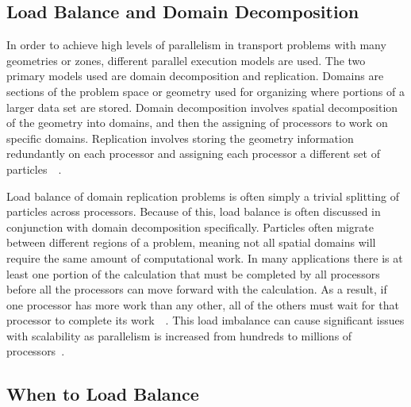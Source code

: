 \subsection{ \textbf{ Load Balance and Domain Decomposition} }

In order to achieve high levels of parallelism in transport problems with many geometries or zones, different parallel execution models are used.
%
The two primary models used are domain decomposition and replication.
%
Domains are sections of the problem space or geometry used for organizing where portions of a larger data set are stored. 
%
Domain decomposition involves spatial decomposition of the geometry into domains, and then the assigning of processors to work on specific domains.
%
Replication involves storing the geometry information redundantly on each processor and assigning each processor a different set of particles~\cite{procassini2005load}~\cite{o2005dynamic}.

Load balance of domain replication problems is often simply a trivial splitting of particles across processors.
%
Because of this, load balance is often discussed in conjunction with domain decomposition specifically.
%
Particles often migrate between different regions of a problem, meaning not all spatial domains will require the same amount of computational work.
%
In many applications there is at least one portion of the calculation that must be completed by all processors before all the processors can move forward with the calculation.
%
As a result, if one processor has more work than any other, all of the others must wait for that processor to complete its work~\cite{procassini2005load}~\cite{o2005dynamic}.
%
This load imbalance can cause significant issues with scalability as parallelism is increased from hundreds to millions of processors~\cite{o2013scalable}.
%

\subsection*{When to Load Balance}

